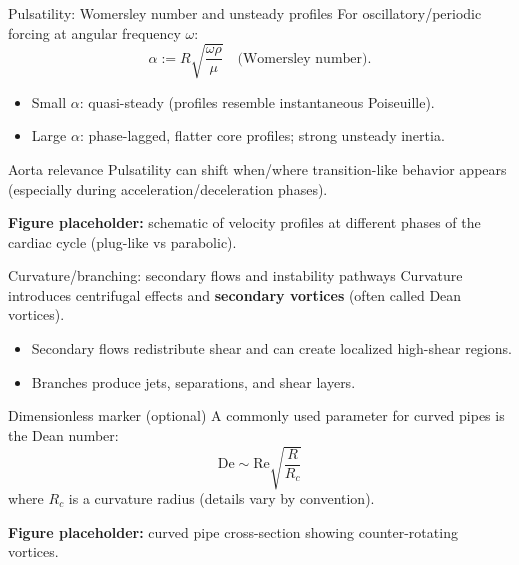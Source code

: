 \documentclass[aspectratio=169]{beamer}
\newcommand{\Rey}{\mathrm{Re}}
\newcommand{\Wo}{\alpha}
\begin{document}
\begin{frame}{Pulsatility: Womersley number and unsteady profiles}
For oscillatory/periodic forcing at angular frequency $\omega$:
\[
\Wo := R\sqrt{\frac{\omega\rho}{\mu}}
\quad\text{(Womersley number)}.
\]

\begin{itemize}
  \item Small $\Wo$: quasi-steady (profiles resemble instantaneous Poiseuille).
  \item Large $\Wo$: phase-lagged, flatter core profiles; strong unsteady inertia.
\end{itemize}

\begin{block}{Aorta relevance}
Pulsatility can shift when/where transition-like behavior appears (especially during acceleration/deceleration phases).
\end{block}

\textbf{Figure placeholder:} schematic of velocity profiles at different phases of the cardiac cycle (plug-like vs parabolic).
\end{frame}

\begin{frame}{Curvature/branching: secondary flows and instability pathways}
Curvature introduces centrifugal effects and \textbf{secondary vortices} (often called Dean vortices).

\begin{itemize}
  \item Secondary flows redistribute shear and can create localized high-shear regions.
  \item Branches produce jets, separations, and shear layers.
\end{itemize}

\begin{block}{Dimensionless marker (optional)}
A commonly used parameter for curved pipes is the Dean number:
\[
\mathrm{De} \sim \Rey \sqrt{\frac{R}{R_c}}
\]
where $R_c$ is a curvature radius (details vary by convention).
\end{block}

\textbf{Figure placeholder:} curved pipe cross-section showing counter-rotating vortices.
\end{frame}
\end{document}
